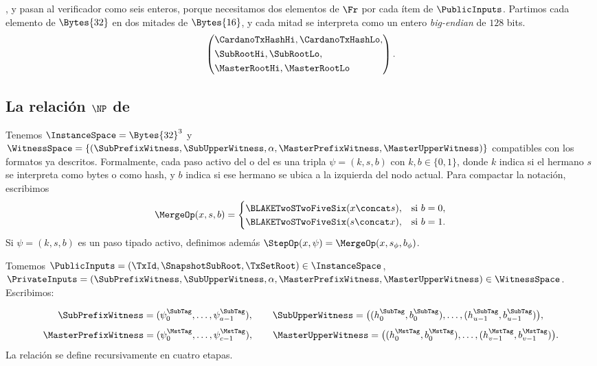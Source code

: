 \TxId, \SnapshotSubRoot y \TxSetRoot pasan al verificador \Groth \Onchain como seis enteros, porque necesitamos dos elementos de $\Fr$ por cada ítem de $\PublicInputs$. Partimos cada elemento de $\Bytes{32}$ en dos mitades de $\Bytes{16}$, y cada mitad se interpreta como un entero \textit{big-endian} de $128$ bits.
$$\left(\begin{aligned}
  &\CardanoTxHashHi, \CardanoTxHashLo,\\
  &\SubRootHi, \SubRootLo,\\
  &\MasterRootHi, \MasterRootLo
\end{aligned}\right).$$

\subsection{La relación \texorpdfstring{\(\NP\)}{NP} de \TxSnapshotMembershipCircuit}

Tenemos $\InstanceSpace = \Bytes{32}^3$ y $\WitnessSpace = \left\{(\SubPrefixWitness, \SubUpperWitness, \alpha, \MasterPrefixWitness, \MasterUpperWitness)\right\}$ compatibles con los formatos ya descritos. Formalmente, cada paso activo del \SubPrefix o del \MasterPrefix es una tripla $\psi = (k, s, b)$ con $k,b \in \{0,1\}$, donde $k$ indica si el hermano $s$ se interpreta como bytes o como hash, y $b$ indica si ese hermano se ubica a la izquierda del nodo actual. Para compactar la notación, escribimos
$$\MergeOp(x,s,b) = \begin{cases}
  \BLAKETwoSTwoFiveSix(x \concat s), & \text{si } b = 0,\\
  \BLAKETwoSTwoFiveSix(s \concat x), & \text{si } b = 1.
\end{cases}$$
Si $\psi=(k,s,b)$ es un paso tipado activo, definimos además $\StepOp(x,\psi)=\MergeOp(x,s_\phi,b_\phi)$.

Tomemos $\PublicInputs = (\TxId,\SnapshotSubRoot,\TxSetRoot) \in \InstanceSpace$, $\PrivateInputs = (\SubPrefixWitness, \SubUpperWitness, \alpha, \MasterPrefixWitness, \MasterUpperWitness) \in \WitnessSpace$.
Escribimos:

$$\SubPrefixWitness = (\psi^{\SubTag}_0,\ldots,\psi^{\SubTag}_{a-1}), \qquad \SubUpperWitness = \bigl((h^{\SubTag}_0,b^{\SubTag}_0),\ldots,(h^{\SubTag}_{u-1},b^{\SubTag}_{u-1})\bigr),$$
$$\MasterPrefixWitness = (\psi^{\MstTag}_0,\ldots,\psi^{\MstTag}_{c-1}), \qquad \MasterUpperWitness = \bigl((h^{\MstTag}_0,b^{\MstTag}_0),\ldots,(h^{\MstTag}_{v-1},b^{\MstTag}_{v-1})\bigr).$$
La relación \TxSnapshotMembershipRelation se define recursivamente en cuatro etapas.

